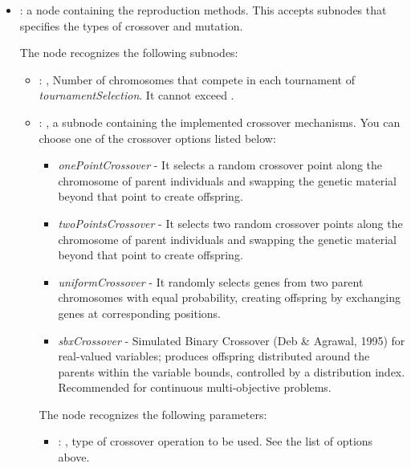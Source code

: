 \begin{itemize}
\begin{itemize}
        \item {}:
          a node containing the reproduction methods. This accepts subnodes that specifies the types
          of crossover and mutation.

          The  node recognizes the following subnodes:
          \begin{itemize}
            \item {}: ,
              Number of chromosomes that compete in each tournament of \textit{tournamentSelection}.
              It cannot         exceed . 

            \item {}: ,
              a subnode containing the implemented crossover mechanisms. You can choose one of the
              crossover options listed below:                   \begin{itemize}
              \item \textit{onePointCrossover} - It selects a random crossover point along the
              chromosome of parent individuals and swapping the genetic material beyond that point
              to create offspring.                     \item \textit{twoPointsCrossover} - It
              selects two random crossover points along the chromosome of parent individuals and
              swapping the genetic material beyond that point to create offspring.
              \item \textit{uniformCrossover} - It randomly selects genes from two parent
              chromosomes with equal probability, creating offspring by exchanging genes at
              corresponding positions.                     \item \textit{sbxCrossover} - Simulated
              Binary Crossover (Deb \& Agrawal, 1995) for real-valued variables; produces offspring
              distributed around the parents within the variable bounds, controlled by a
              distribution index. Recommended for continuous multi-objective problems.
              \end{itemize}
              The  node recognizes the following parameters:
                \begin{itemize}
                  \item {}: ,
                    type of crossover operation to be used. See the list of options above.
              \end{itemize}


\end{itemize}
\end{itemize}
\end{itemize}
